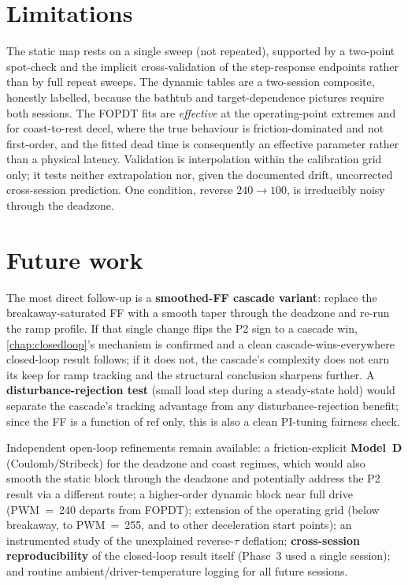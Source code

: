 \section{Limitations}
\label{sec:concl-limits}

The static map rests on a single sweep (not repeated), supported by a two-point spot-check and the implicit cross-validation of the step-response endpoints rather than by full repeat sweeps. The dynamic tables are a two-session composite, honestly labelled, because the bathtub and target-dependence pictures require both sessions. The FOPDT fits are \emph{effective} at the operating-point extremes and for coast-to-rest decel, where the true behaviour is friction-dominated and not first-order, and the fitted dead time is consequently an effective parameter rather than a physical latency. Validation is interpolation within the calibration grid only; it tests neither extrapolation nor, given the documented drift, uncorrected cross-session prediction. One condition, reverse $240\to100$, is irreducibly noisy through the deadzone.

\section{Future work}
\label{sec:concl-future}

The most direct follow-up is a \textbf{smoothed-FF cascade variant}: replace the breakaway-saturated FF with a smooth taper through the deadzone and re-run the ramp profile. If that single change flips the P2 sign to a cascade win, \cref{chap:closedloop}'s mechanism is confirmed and a clean cascade-wins-everywhere closed-loop result follows; if it does not, the cascade's complexity does not earn its keep for ramp tracking and the structural conclusion sharpens further. A \textbf{disturbance-rejection test} (small load step during a steady-state hold) would separate the cascade's tracking advantage from any disturbance-rejection benefit; since the FF is a function of $\text{ref}$ only, this is also a clean PI-tuning fairness check.

Independent open-loop refinements remain available: a friction-explicit \textbf{Model~D} (Coulomb/Stribeck) for the deadzone and coast regimes, which would also smooth the static block through the deadzone and potentially address the P2 result via a different route; a higher-order dynamic block near full drive (PWM~=~240 departs from FOPDT); extension of the operating grid (below breakaway, to PWM~=~255, and to other deceleration start points); an instrumented study of the unexplained reverse-$\tau$ deflation; \textbf{cross-session reproducibility} of the closed-loop result itself (Phase~3 used a single session); and routine ambient/driver-temperature logging for all future sessions.

